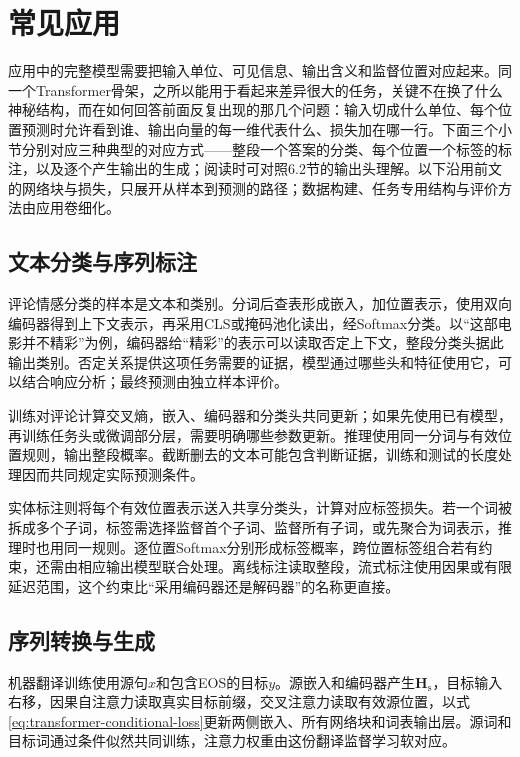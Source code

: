 \FloatBarrier

\section{常见应用}
\label{sec:transformer-applications}

应用中的完整模型需要把输入单位、可见信息、输出含义和监督位置对应起来。同一个Transformer骨架，之所以能用于看起来差异很大的任务，关键不在换了什么神秘结构，而在如何回答前面反复出现的那几个问题：输入切成什么单位、每个位置预测时允许看到谁、输出向量的每一维代表什么、损失加在哪一行。下面三个小节分别对应三种典型的对应方式——整段一个答案的分类、每个位置一个标签的标注，以及逐个产生输出的生成；阅读时可对照6.2节的输出头理解。以下沿用前文的网络块与损失，只展开从样本到预测的路径；数据构建、任务专用结构与评价方法由应用卷细化。

\subsection{文本分类与序列标注}
\label{sec:transformer-text-applications}

评论情感分类的样本是文本和类别。分词后查表形成嵌入，加位置表示，使用双向编码器得到上下文表示，再采用CLS或掩码池化读出，经Softmax分类。以“这部电影并不精彩”为例，编码器给“精彩”的表示可以读取否定上下文，整段分类头据此输出类别。否定关系提供这项任务需要的证据，模型通过哪些头和特征使用它，可以结合响应分析；最终预测由独立样本评价。

训练对评论计算交叉熵，嵌入、编码器和分类头共同更新；如果先使用已有模型，再训练任务头或微调部分层，需要明确哪些参数更新。推理使用同一分词与有效位置规则，输出整段概率。截断删去的文本可能包含判断证据，训练和测试的长度处理因而共同规定实际预测条件。

实体标注则将每个有效位置表示送入共享分类头，计算对应标签损失。若一个词被拆成多个子词，标签需选择监督首个子词、监督所有子词，或先聚合为词表示，推理时也用同一规则。逐位置Softmax分别形成标签概率，跨位置标签组合若有约束，还需由相应输出模型联合处理。离线标注读取整段，流式标注使用因果或有限延迟范围，这个约束比“采用编码器还是解码器”的名称更直接。

\subsection{序列转换与生成}
\label{sec:transformer-generation-applications}

机器翻译训练使用源句$x$和包含EOS的目标$y$。源嵌入和编码器产生$\bm H_{\mathrm s}$，目标输入右移，因果自注意力读取真实目标前缀，交叉注意力读取有效源位置，以式\eqref{eq:transformer-conditional-loss}更新两侧嵌入、所有网络块和词表输出层。源词和目标词通过条件似然共同训练，注意力权重由这份翻译监督学习软对应。

